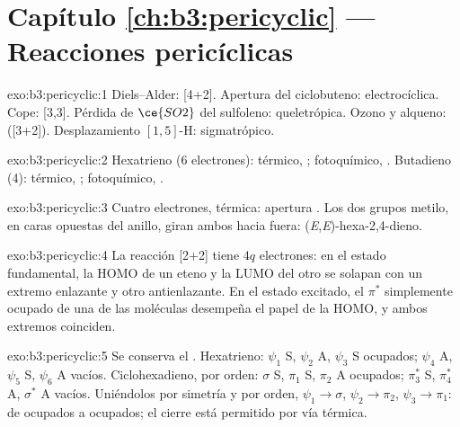 \section*{Capítulo \ref{ch:b3:pericyclic} --- Reacciones pericíclicas}

\begin{solution}{exo:b3:pericyclic:1}
Diels--Alder:  [4+2]. Apertura del ciclobuteno: electrocíclica. Cope: 
[3,3]. Pérdida de $\ce{SO2}$ del sulfoleno: queletrópica. Ozono y alqueno: 
([3+2]). Desplazamiento $[1,5]$-H: sigmatrópico.
\end{solution}

\begin{solution}{exo:b3:pericyclic:2}
Hexatrieno (6 electrones): térmico, ; fotoquímico, .
Butadieno (4): térmico, ; fotoquímico, .
\end{solution}

\begin{solution}{exo:b3:pericyclic:3}
Cuatro electrones, térmica: apertura . Los dos grupos metilo, en caras
opuestas del anillo, giran ambos hacia fuera: (\textit{E},\textit{E})-hexa-2,4-dieno.
\end{solution}

\begin{solution}{exo:b3:pericyclic:4}
La reacción [2+2]  tiene $4q$ electrones: en el estado fundamental, la HOMO de un
eteno y la LUMO del otro se solapan con un extremo enlazante y otro antienlazante.
En el estado excitado, el $\pi^*$ simplemente ocupado de una de las moléculas desempeña el papel de la
HOMO, y ambos extremos coinciden.
\end{solution}

\begin{solution}{exo:b3:pericyclic:5}
Se conserva el . Hexatrieno: $\psi_1$ S, $\psi_2$ A, $\psi_3$ S ocupados; $\psi_4$ A, $\psi_5$ S, $\psi_6$ A vacíos.
Ciclohexadieno, por orden: $\sigma$ S, $\pi_1$ S, $\pi_2$ A ocupados; $\pi_3^*$ S, $\pi_4^*$ A, $\sigma^*$ A vacíos. Uniéndolos por
simetría y por orden, $\psi_1 \to \sigma$, $\psi_2 \to \pi_2$, $\psi_3 \to \pi_1$: de ocupados a ocupados; el cierre 
está permitido por vía térmica.
\end{solution}

